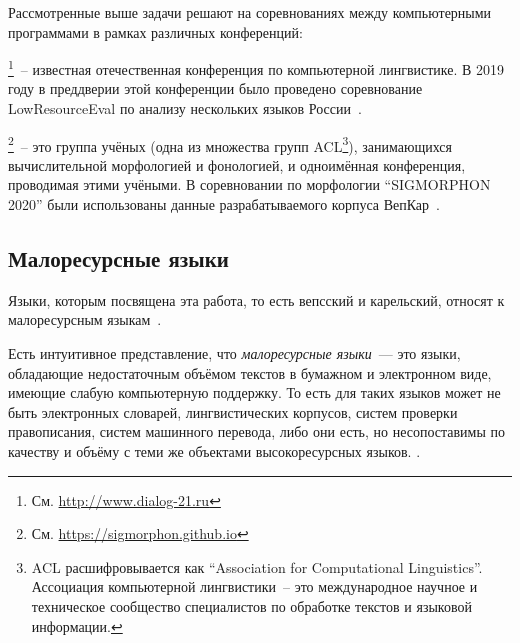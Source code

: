 Рассмотренные выше задачи решают на соревнованиях
между компьютерными программами в рамках различных конференций:
\begin{description}[align=left]
    \item [Диалог]\footnote{См. \url{http://www.dialog-21.ru}}~--
            известная отечественная конференция
            по компьютерной лингвистике.
            В 2019 году в преддверии этой конференции
            было проведено соревнование LowResourceEval
            по анализу нескольких языков России~\cite{Klyachko2019LowresourceEval}.

    \item [SIGMORPHON]\label{SIGMORPHON}\footnote{См. \url{https://sigmorphon.github.io}}~--
                это группа учёных (одна из множества групп ACL\footnote{%
                ACL расшифровывается как ``Association for Computational Linguistics''.
                Ассоциация компьютерной лингвистики~-- это
                международное научное и техническое сообщество специалистов
                по обработке текстов и языковой информации.
            }),
            занимающихся вычислительной морфологией и фонологией,
            и одноимённая конференция, проводимая этими учёными.
            В соревновании по морфологии ``SIGMORPHON 2020''
            были использованы данные
            разрабатываемого корпуса ВепКар~\cite{Vylomova2020SIGMORPHON}.

\end{description}



\subsection{Малоресурсные языки}\label{sect_low-resource}

Языки, которым посвящена эта работа, то есть вепсский и карельский,
относят к малоресурсным языкам~.

Есть интуитивное представление, что \emph{малоресурсные языки}~---
это языки, обладающие недостаточным объёмом текстов
в бумажном и электронном виде,
имеющие слабую компьютерную поддержку.
То есть для таких языков может не быть
электронных словарей, лингвистических корпусов,
систем проверки правописания, систем машинного перевода,
либо они есть, но несопоставимы по качеству и объёму с теми же объектами
высокоресурсных языков.
.

